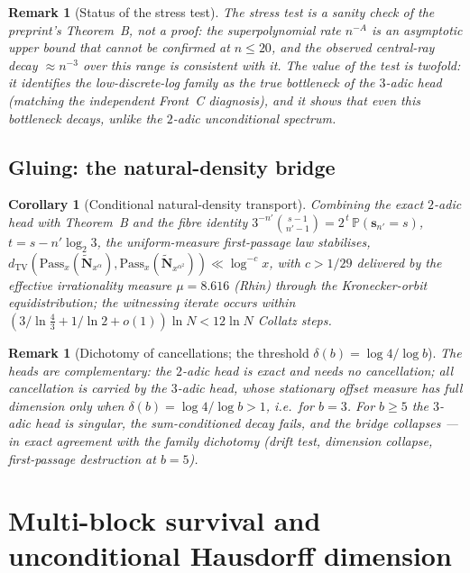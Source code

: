 \documentclass[12pt,a4paper]{article}
\newtheorem{corollary}[theorem]{Corollary}
\newtheorem{remark}[theorem]{Remark}
\begin{document}
\begin{remark}[Status of the stress test]
The stress test is a sanity check of the preprint's Theorem~B, not a proof:
the superpolynomial rate $n^{-A}$ is an asymptotic upper bound that cannot be
confirmed at $n\le20$, and the observed central-ray decay $\approx n^{-3}$
over this range is consistent with it. The value of the test is twofold: it
identifies the low-discrete-log family as the true bottleneck of the $3$-adic
head (matching the independent Front~C diagnosis), and it shows that even this
bottleneck decays, unlike the $2$-adic unconditional spectrum.
\end{remark}

\subsection{Gluing: the natural-density bridge}

\begin{corollary}[Conditional natural-density transport]
Combining the exact $2$-adic head with Theorem~B and the fibre identity
$3^{-n'}\binom{s-1}{n'-1}=2^{\,t}\,\mathbb P(\mathbf s_{n'}=s)$,
$t=s-n'\log_2 3$, the uniform-measure first-passage law stabilises,
$d_{\mathrm{TV}}(\mathrm{Pass}_x(\widetilde{\mathbf N}_{x^\alpha}),
\mathrm{Pass}_x(\widetilde{\mathbf N}_{x^{\alpha^2}}))\ll\log^{-c}x$,
with $c>1/29$ delivered by the effective irrationality measure $\mu=8.616$
(Rhin) through the Kronecker-orbit equidistribution; the witnessing iterate
occurs within $(3/\ln\frac43+1/\ln2+o(1))\ln N<12\ln N$ Collatz steps.
\end{corollary}

\begin{remark}[Dichotomy of cancellations; the threshold $\delta(b)=\log4/\log b$]
The heads are complementary: the $2$-adic head is exact and needs no
cancellation; \emph{all} cancellation is carried by the $3$-adic head, whose
stationary offset measure has full dimension only when
$\delta(b)=\log4/\log b>1$, i.e.\ for $b=3$. For $b\ge5$ the $3$-adic head is
singular, the sum-conditioned decay fails, and the bridge collapses --- in
exact agreement with the family dichotomy (drift test, dimension collapse,
first-passage destruction at $b=5$).
\end{remark}

\section{Multi-block survival and unconditional Hausdorff dimension}
\end{document}
